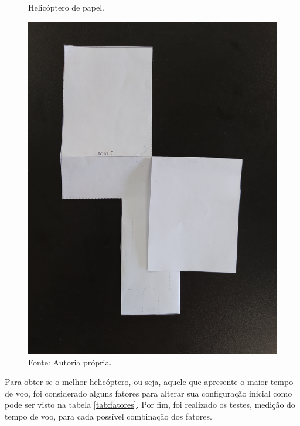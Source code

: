 \begin{figure}[H]
  \caption{Helicóptero de papel.}
  \centering
  \includegraphics[width=1\textwidth]{images/IMG_20200918_162251.jpg}
  \caption*{Fonte: Autoria própria.}
  \label{fig:heli_papel}
\end{figure}

Para obter-se o melhor helicóptero, ou seja, aquele que apresente o maior tempo de voo, foi considerado alguns fatores para alterar sua configuração inicial como pode ser visto na tabela \ref{tab:fatores}. Por fim, foi realizado os testes, medição do tempo de voo, para cada possível combinação dos fatores.


